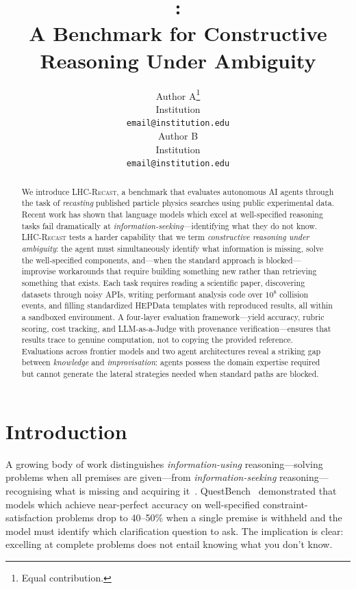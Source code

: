 \documentclass{article}
\title{\toolkit{}:\\A Benchmark for Constructive Reasoning Under Ambiguity}
\author{
  Author A\thanks{Equal contribution.} \\
  Institution \\
  \texttt{email@institution.edu} \\
  \And
  Author B\footnotemark[1] \\
  Institution \\
  \texttt{email@institution.edu} \\
}
\newcommand{\toolkit}{\textsc{LHC-Recast}}
\begin{document}
\maketitle

\begin{abstract}
We introduce \toolkit{}, a benchmark that evaluates autonomous AI agents through the task of \emph{recasting} published particle physics searches using public experimental data.
Recent work has shown that language models which excel at well-specified reasoning tasks fail dramatically at \emph{information-seeking}---identifying what they do not know.
\toolkit{} tests a harder capability that we term \emph{constructive reasoning under ambiguity}: the agent must simultaneously identify what information is missing, solve the well-specified components, and---when the standard approach is blocked---improvise workarounds that require building something new rather than retrieving something that exists.
Each task requires reading a scientific paper, discovering datasets through noisy APIs, writing performant analysis code over $10^8$ collision events, and filling standardized HEPData templates with reproduced results, all within a sandboxed environment.
A four-layer evaluation framework---yield accuracy, rubric scoring, cost tracking, and LLM-as-a-Judge with provenance verification---ensures that results trace to genuine computation, not to copying the provided reference.
Evaluations across frontier models and two agent architectures reveal a striking gap between \emph{knowledge} and \emph{improvisation}: agents possess the domain expertise required but cannot generate the lateral strategies needed when standard paths are blocked.
\end{abstract}


\section{Introduction}
\label{sec:intro}

A growing body of work distinguishes \emph{information-using} reasoning---solving problems when all premises are given---from \emph{information-seeking} reasoning---recognising what is missing and acquiring it~\citep{li2025questbench}.
QuestBench~\citep{li2025questbench} demonstrated that models which achieve near-perfect accuracy on well-specified constraint-satisfaction problems drop to 40--50\% when a single premise is withheld and the model must identify which clarification question to ask.
The implication is clear: excelling at complete problems does not entail knowing what you don't know.
\end{document}
